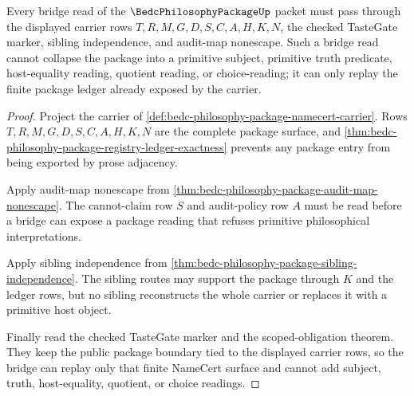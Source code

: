 \begin{theorem}
\label{thm:bedc-philosophy-package-bridge-boundary}
Every bridge read of the $\BedcPhilosophyPackageUp$ packet must pass through the displayed carrier rows $T,R,M,G,D,S,C,A,H,K,N$, the checked TasteGate marker, sibling independence, and audit-map nonescape. Such a bridge read cannot collapse the package into a primitive subject, primitive truth predicate, host-equality reading, quotient reading, or choice-reading; it can only replay the finite package ledger already exposed by the carrier.
\end{theorem}
\begin{proof}
Project the carrier of \autoref{def:bedc-philosophy-package-namecert-carrier}. Rows $T,R,M,G,D,S,C,A,H,K,N$ are the complete package surface, and \autoref{thm:bedc-philosophy-package-registry-ledger-exactness} prevents any package entry from being exported by prose adjacency.

Apply audit-map nonescape from \autoref{thm:bedc-philosophy-package-audit-map-nonescape}. The cannot-claim row $S$ and audit-policy row $A$ must be read before a bridge can expose a package reading that refuses primitive philosophical interpretations.

Apply sibling independence from \autoref{thm:bedc-philosophy-package-sibling-independence}. The sibling routes may support the package through $K$ and the ledger rows, but no sibling reconstructs the whole carrier or replaces it with a primitive host object.

Finally read the checked TasteGate marker and the scoped-obligation theorem. They keep the public package boundary tied to the displayed carrier rows, so the bridge can replay only that finite NameCert surface and cannot add subject, truth, host-equality, quotient, or choice readings.
\end{proof}


